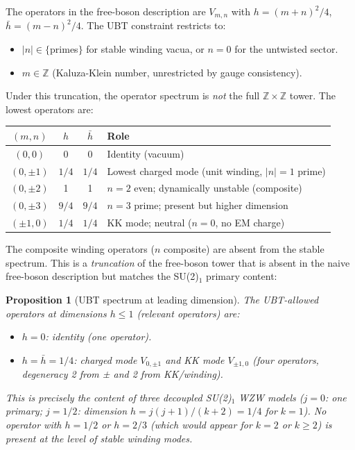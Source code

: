 \documentclass[12pt,a4paper]{article}
\newtheorem{proposition}[theorem]{Proposition}
\theoremstyle{definition}
\theoremstyle{remark}
\begin{document}
The operators in the free-boson description are $V_{m,n}$ with $h = (m+n)^2/4$,
$\bar{h} = (m-n)^2/4$.  The UBT constraint restricts to:
\begin{itemize}
  \item $|n| \in \{$primes$\}$ for stable winding vacua, or $n = 0$ for the
        untwisted sector.
  \item $m \in \mathbb{Z}$ (Kaluza-Klein number, unrestricted by gauge consistency).
\end{itemize}

Under this truncation, the operator spectrum is \emph{not} the full
$\mathbb{Z} \times \mathbb{Z}$ tower.  The lowest operators are:
\begin{center}
\renewcommand{\arraystretch}{1.25}
\begin{tabular}{cccl}
\toprule
$(m, n)$ & $h$ & $\bar{h}$ & Role \\
\midrule
$(0, 0)$ & 0 & 0 & Identity (vacuum) \\
$(0, \pm 1)$ & $1/4$ & $1/4$ & Lowest charged mode (unit winding, $|n|=1$ prime) \\
$(0, \pm 2)$ & 1 & 1 & $n=2$ even; dynamically unstable (composite) \\
$(0, \pm 3)$ & $9/4$ & $9/4$ & $n=3$ prime; present but higher dimension \\
$(\pm 1, 0)$ & $1/4$ & $1/4$ & KK mode; neutral ($n=0$, no EM charge) \\
\bottomrule
\end{tabular}
\end{center}

The composite winding operators ($n$ composite) are absent from the stable
spectrum.  This is a \emph{truncation} of the free-boson tower that is absent
in the naive free-boson description but matches the SU(2)$_1$ primary content:

\begin{proposition}[UBT spectrum at leading dimension]
\label{prop:m4:spectrum}
The UBT-allowed operators at dimensions $h \leq 1$ (relevant operators) are:
\begin{itemize}
  \item $h = 0$: identity (one operator).
  \item $h = \bar{h} = 1/4$: charged mode $V_{0,\pm 1}$ and KK mode $V_{\pm 1, 0}$
        (four operators, degeneracy 2 from ± and 2 from KK/winding).
\end{itemize}
This is precisely the content of three decoupled SU(2)$_1$ WZW models
($j = 0$: one primary; $j = 1/2$: dimension $h = j(j+1)/(k+2) = 1/4$ for $k=1$).
No operator with $h = 1/2$ or $h = 2/3$ (which would appear for $k = 2$ or
$k \geq 2$) is present at the level of stable winding modes.
\end{proposition}
\end{document}
